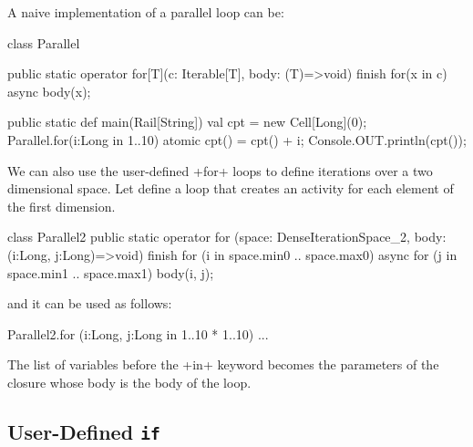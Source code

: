 \begin{ex}
  A naive implementation of a parallel loop can be:
\begin{xten}
class Parallel {

  public static operator for[T](c: Iterable[T], body: (T)=>void) {
    finish {
      for(x in c) {
        async { body(x); }
      }
    }
  }

  public static def main(Rail[String]) {
    val cpt = new Cell[Long](0);
    Parallel.for(i:Long in 1..10) {
      atomic { cpt() = cpt() + i; }
    }
    Console.OUT.println(cpt());
  }
}
\end{xten}
\end{ex}

\begin{ex}
  We can also use the user-defined \xcd+for+ loops to define
  iterations over a two dimensional space. Let define a loop that
  creates an activity for each element of the first dimension.
\begin{xten}
class Parallel2 {
  public static operator for (space: DenseIterationSpace_2,
                              body: (i:Long, j:Long)=>void) {
    finish {
      for (i in space.min0 .. space.max0) {
        async for (j in space.min1 .. space.max1) {
          body(i, j);
        }
      }
    }
  }
}
\end{xten}
and it can be used as follows:
\begin{xten}
Parallel2.for (i:Long, j:Long in 1..10 * 1..10) { ... }
\end{xten}
The list of variables before the \xcd+in+ keyword becomes the
parameters of the closure whose body is the body of the loop.
\end{ex}

\subsection{User-Defined \texttt{if}}


